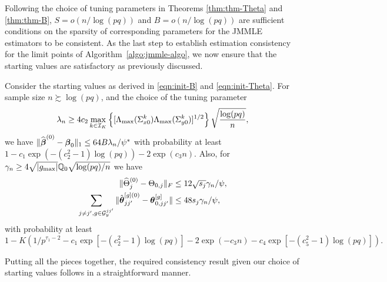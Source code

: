 Following the choice of tuning parameters in Theorems \ref{thm:thm-Theta} and \ref{thm:thm-B}, $S = o(n/\log (pq))$ and $B = o(n/\log (pq))$ are sufficient conditions on the sparsity of corresponding parameters for the JMMLE estimators to be consistent. As the last step to establish estimation consistency for the limit points of Algorithm~\ref{algo:jmmle-algo}, we now ensure that the starting values are satisfactory as previously discussed.

\begin{theorem}\label{thm:starting-values}
Consider the starting values as derived in \eqref{eqn:init-B} and \eqref{eqn:init-Theta}. For sample size $n \succsim \log(pq)$, and the choice of the tuning parameter
%
\[
\lambda_n \geq 4 c_2 \max_{k \in {\cal{I}}_K} \left\{ [\Lambda_{\max} (\Sigma_{x 0}^k) \Lambda_{\max} (\Sigma_{y 0}^k)]^{1/2} \right\}
\sqrt{ \frac{\log (pq)}{n}},
\]
%
we have $\| \widehat {{\boldsymbol{\beta}}}^{(0)} - {\boldsymbol{\beta}}_0 \|_1 \leq 64 B \lambda_n /\psi^*$ with probability at least $1 - c_1 \exp( -(c_2^2-1) \log(pq)) - 2 \exp(c_3 n)$. Also, for $\gamma_n \geq 4\sqrt{| g_{\max}|} {\mathbb{Q}}_0 \sqrt{ \log (pq)/n}$ we have
%
\begin{align*}
\| \widehat \Theta_j^{(0)} - \Theta_{0,j} \|_F & \leq 12 \sqrt{s_j} \gamma_n / \psi,\\
\sum_{j \neq j', g \in {\cal{G}}_y^{jj'}} \| \hat {{\boldsymbol{\theta}}}_{jj'}^{[g](0)} - {\boldsymbol{\theta}}_{0,jj'}^{[g]} \| & \leq 48 s_j \gamma_n / \psi,
\end{align*}
%
with probability at least
%
$$ 1 - K(1/p^{\tau_1-2} - c_1 \exp [-(c_2^2-1) \log(pq)] - 2 \exp (- c_3 n) - c_4 \exp [-(c_5^2-1) \log(pq)]).
$$
\end{theorem}
%

Putting all the pieces together, the required consistency result given our choice of starting values follows in a straightforward manner.

